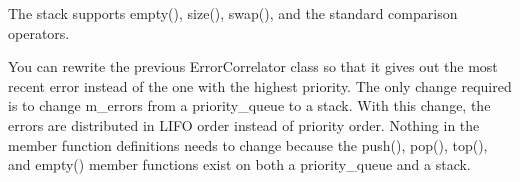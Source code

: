The stack supports empty(), size(), swap(), and the standard comparison operators.


You can rewrite the previous ErrorCorrelator class so that it gives out the most recent error instead of the one with the highest priority. The only change required is to change m\_errors from a priority\_queue to a stack. With this change, the errors are distributed in LIFO order instead of priority order. Nothing in the member function definitions needs to change because the push(), pop(), top(), and empty() member functions exist on both a priority\_queue and a stack.












